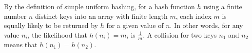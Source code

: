 By the definition of simple uniform hashing, for a hash function $ h $ using a finite number $ n $ distinct keys into an array with finite length $ m $, each index $ m $ is equally likely to be returned by $ h $ for a given value of $ n $. In other words, for any value $ n_i $, the likelihood that $ h(n_i) = m_i $ is $ \frac{1}{m} $. A collision for two keys $ n_1 $ and $ n_2 $ means that $ h(n_1) = h(n_2) $.